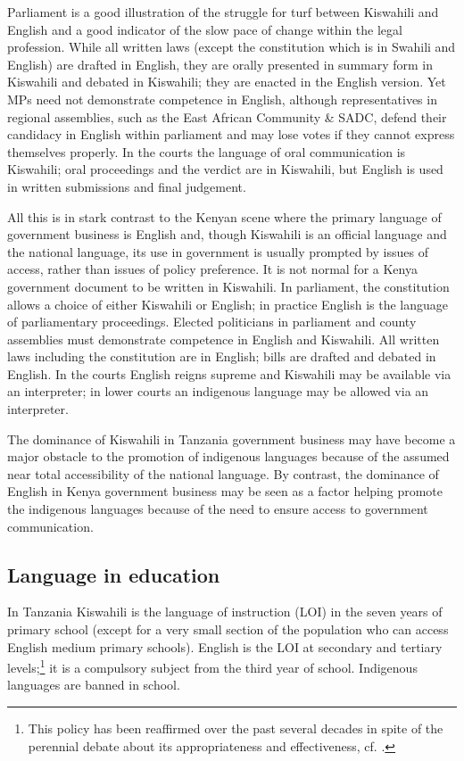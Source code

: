 \documentclass[output=paper,colorlinks,citecolor=brown]{langscibook}
\begin{document}
Parliament is a good illustration of the struggle for turf between Kiswahili and English and a good indicator of the slow pace of change within the legal profession.  While all written laws (except the constitution which is in Swahili and English) are drafted in English, they are orally presented in summary form in Kiswahili and debated in Kiswahili; they are enacted in the English version. Yet MPs need not demonstrate competence in English, although representatives in regional assemblies, such as the East African Community \& SADC, defend their candidacy in English within parliament and may lose votes if they cannot express themselves properly. In the courts the language of oral communication is Kiswahili; oral proceedings and the verdict are in Kiswahili, but English is used in written submissions and final judgement.

All this is in stark contrast to the Kenyan scene where the primary language of government business is English and, though Kiswahili is an official language and the national language, its use in government is usually prompted by issues of access, rather than issues of policy preference. It is not normal for a Kenya government document to be written in Kiswahili. In parliament, the constitution allows a choice of either Kiswahili or English; in practice English is the language of parliamentary proceedings. Elected politicians in parliament and county assemblies must demonstrate competence in English and Kiswahili.  All written laws including the constitution are in English; bills are drafted and debated in English. In the courts English reigns supreme and Kiswahili may be available via an interpreter; in lower courts an indigenous language may be allowed via an interpreter.

The dominance of Kiswahili in Tanzania government business may have become a major obstacle to the promotion of indigenous languages because of the assumed near total accessibility of the national language. By contrast, the dominance of English in Kenya government business may be seen as a factor helping promote the indigenous languages because of the need to ensure access to government communication.

\subsection{Language in education} 
In Tanzania Kiswahili is the language of instruction (LOI) in the seven years of primary school (except for a very small section of the population who can access English medium primary schools). English is the LOI at secondary and tertiary levels;\footnote{This policy has been reaffirmed over the past several decades in spite of the perennial debate about its appropriateness and effectiveness, cf. \citet{Tanzania-Government1995, Tanzania-Government2014, QorroEtAl2012}.} it is a compulsory subject from the third year of school. Indigenous languages are banned in school.
\end{document}
